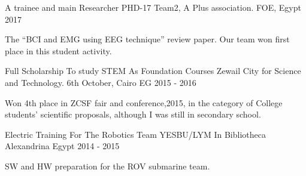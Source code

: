 \begin{cventries}

    \cventry
      {A trainee and main Researcher} %
      {PHD-17 Team2, A Plus association.} %
      {FOE, Egypt} %
      {2017} %
      {
        \begin{cvitems} %
          \item {The “BCI and EMG using EEG technique” review paper. Our team won first place in this student activity.}
    \end{cvitems}
      }
  \end{cventries}


\begin{cventries}

    \cventry
      {Full Scholarship To study STEM As Foundation Courses} %
      {Zewail City for Science and Technology.} %
      {6th October, Cairo EG} %
      {2015 -  2016} %
      {
        \begin{cvitems} %
          \item {Won 4th place in ZCSF fair and conference,2015, in the category of College students’ scientific proposals, although I was still in secondary school.}
    \end{cvitems}
      }
  \end{cventries}


\begin{cventries}

    \cventry
      {Electric Training For The Robotics Team } %
      {YESBU/LYM In Bibliotheca Alexandrina} %
      {Egypt} %
      {2014 - 2015} %
      {
        \begin{cvitems} %
          \item {SW and HW preparation for the ROV submarine team.}
    \end{cvitems}
      }
  \end{cventries}


